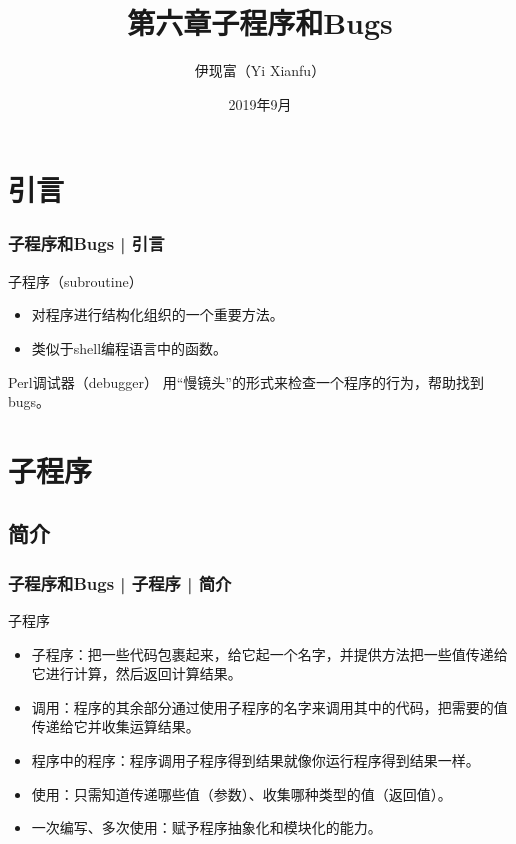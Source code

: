 


\title[子程序和Bugs]{第六章\quad 子程序和Bugs}
\author[Yixf]{伊现富（Yi Xianfu）}
\date{2019年9月}




\section{引言}
\begin{frame}
  \frametitle{子程序和Bugs | 引言}
  \begin{block}{子程序（subroutine）}
    \begin{itemize}
      \item 对程序进行结构化组织的一个重要方法。
      \item 类似于shell编程语言中的函数。
    \end{itemize}
  \end{block}
  \pause
  \begin{block}{Perl调试器（debugger）}
    用“慢镜头”的形式来检查一个程序的行为，帮助找到bugs。
  \end{block}
\end{frame}

\section{子程序}
\subsection{简介}
\begin{frame}
  \frametitle{子程序和Bugs | 子程序 | 简介}
  \begin{block}{子程序}
    \begin{itemize}
      \item 子程序：把一些代码包裹起来，给它起一个名字，并提供方法把一些值传递给它进行计算，然后返回计算结果。
      \item 调用：程序的其余部分通过使用子程序的名字来调用其中的代码，把需要的值传递给它并收集运算结果。
      \item 程序中的程序：程序调用子程序得到结果就像你运行程序得到结果一样。
      \item 使用：只需知道传递哪些值（参数）、收集哪种类型的值（返回值）。
      \item 一次编写、多次使用：赋予程序抽象化和模块化的能力。
    \end{itemize}
  \end{block}
\end{frame}

